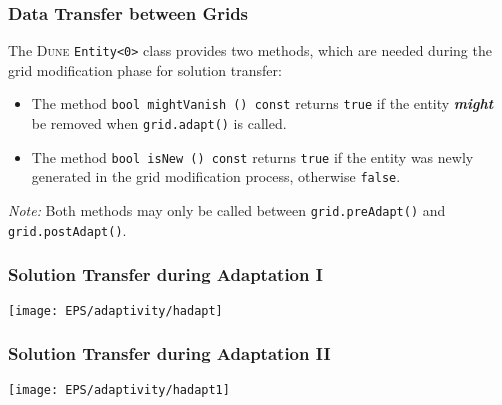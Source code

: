 \begin{frame}
  \frametitle{Data Transfer between Grids}

  The {\scshape Dune} \lstinline{Entity<0>} class provides two methods, which are
  needed during the grid modification phase for solution transfer:
  \begin{itemize}
    \item The method\newline
      \lstinline{bool mightVanish () const}\newline
      returns \lstinline{true} if the entity {\bf \emph{might}} be removed when
      \lstinline{grid.adapt()} is called. 

      \pause

    \item The method\newline
      \lstinline{bool isNew () const}\newline
      returns \lstinline{true} if the entity was newly generated in the
      grid modification process, otherwise \lstinline{false}.
  \end{itemize}

  \pause

  \begin{block}{\emph{Note:}}
    Both methods may only be called between \lstinline{grid.preAdapt()}
    and \lstinline{grid.postAdapt()}.
  \end{block}

\end{frame}

\begin{frame}
  \frametitle{Solution Transfer during Adaptation I}  

  \begin{center}
    \texttt{[image: EPS/adaptivity/hadapt]}
  \end{center}

\end{frame}

\begin{frame}
  \frametitle{Solution Transfer during Adaptation II}  

  \begin{center}
    \texttt{[image: EPS/adaptivity/hadapt1]}
  \end{center}

\end{frame}

